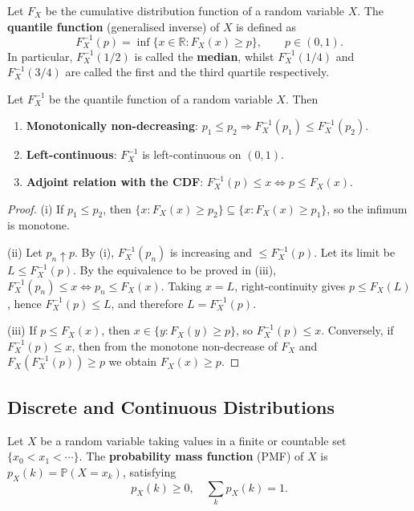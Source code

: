 \begin{definition}\label{def:quantile}
Let $F_X$ be the cumulative distribution function of a random variable $X$. The \textbf{quantile function} (generalised inverse) of $X$ is defined as
\[
F_X^{-1}(p) = \inf\{x \in \mathbb{R} : F_X(x) \ge p\}, \qquad p \in (0, 1).
\]
In particular, $F_X^{-1}(1/2)$ is called the \textbf{median}, whilst $F_X^{-1}(1/4)$ and $F_X^{-1}(3/4)$ are called the first and the third quartile respectively.
\end{definition}

\begin{proposition}\label{prop:quantile_properties}
Let $F_X^{-1}$ be the quantile function of a random variable $X$. Then
\begin{enumerate}[label=(\roman*)]
    \item \textbf{Monotonically non-decreasing}: $p_1 \le p_2 \Rightarrow F_X^{-1}(p_1) \le F_X^{-1}(p_2)$.
    \item \textbf{Left-continuous}: $F_X^{-1}$ is left-continuous on $(0,1)$.
    \item \textbf{Adjoint relation with the CDF}: $F_X^{-1}(p) \le x \iff p \le F_X(x)$.
\end{enumerate}
\end{proposition}

\begin{proof}
(i) If $p_1 \le p_2$, then $\{x : F_X(x) \ge p_2\} \subseteq \{x : F_X(x) \ge p_1\}$, so the infimum is monotone.

(ii) Let $p_n \uparrow p$. By (i), $F_X^{-1}(p_n)$ is increasing and $\le F_X^{-1}(p)$. Let its limit be $L \le F_X^{-1}(p)$. By the equivalence to be proved in (iii), $F_X^{-1}(p_n) \le x \iff p_n \le F_X(x)$. Taking $x = L$, right-continuity gives $p \le F_X(L)$, hence $F_X^{-1}(p) \le L$, and therefore $L = F_X^{-1}(p)$.

(iii) If $p \le F_X(x)$, then $x \in \{y : F_X(y) \ge p\}$, so $F_X^{-1}(p) \le x$. Conversely, if $F_X^{-1}(p) \le x$, then from the monotone non-decrease of $F_X$ and $F_X(F_X^{-1}(p)) \ge p$ we obtain $F_X(x) \ge p$.
\end{proof}

\subsection{Discrete and Continuous Distributions}

\begin{definition}\label{def:discrete_distribution}
Let $X$ be a random variable taking values in a finite or countable set $\{x_0 < x_1 < \cdots\}$. The \textbf{probability mass function} (PMF) of $X$ is $p_X(k) = \mathbb{P}(X = x_k)$, satisfying
\[
p_X(k) \ge 0, \quad \sum_{k} p_X(k) = 1.
\]
\end{definition}

